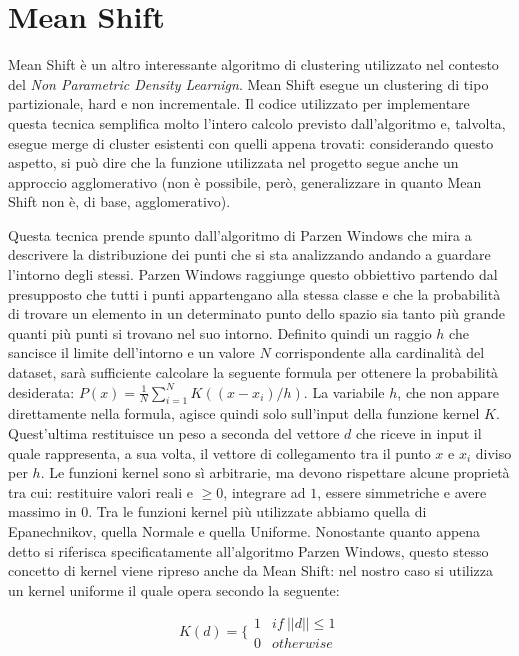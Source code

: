 \documentclass[]{report}
\begin{document}
	  	
\section*{Mean Shift}

	Mean Shift è un altro interessante algoritmo di clustering utilizzato nel contesto del {\it Non Parametric Density Learnign}. Mean Shift esegue un clustering di tipo partizionale, hard e non incrementale. Il codice utilizzato per implementare questa tecnica semplifica molto l'intero calcolo previsto dall'algoritmo e, talvolta, esegue merge di cluster esistenti con quelli appena trovati: considerando questo aspetto, si può dire che la funzione utilizzata nel progetto segue anche un approccio agglomerativo (non è possibile, però, generalizzare in quanto Mean Shift non è, di base, agglomerativo). 
	
	Questa tecnica prende spunto dall'algoritmo di Parzen Windows che mira a descrivere la distribuzione dei punti che si sta analizzando andando a guardare l'intorno degli stessi. Parzen Windows raggiunge questo obbiettivo partendo dal presupposto che tutti i punti appartengano alla stessa classe e che la probabilità di trovare un elemento in un determinato punto dello spazio sia tanto più grande quanti più punti si trovano nel suo intorno. Definito quindi un raggio $h$ che sancisce il limite dell'intorno e un valore $N$ corrispondente alla cardinalità del dataset, sarà sufficiente calcolare la seguente formula per ottenere la probabilità desiderata: $ P(x) = \frac{1}{N}\sum_{i=1}^{N}K((x-x_i)/h)$.  La variabile $h$, che non appare direttamente nella formula, agisce quindi solo sull'input della funzione kernel $K$. Quest'ultima restituisce un peso a seconda del vettore $d$ che riceve in input il quale rappresenta, a sua volta, il vettore di collegamento tra il punto $x$ e $x_i$ diviso per $h$. Le funzioni kernel sono sì arbitrarie, ma devono rispettare alcune proprietà tra cui: restituire valori reali e $\geq 0$, integrare ad $1$, essere simmetriche e avere massimo in $0$. Tra le funzioni kernel più utilizzate abbiamo quella di Epanechnikov, quella Normale e quella Uniforme. Nonostante quanto appena detto si riferisca specificatamente all'algoritmo Parzen Windows, questo stesso concetto di kernel viene ripreso anche da Mean Shift: nel nostro caso si utilizza un kernel uniforme il quale opera secondo la seguente:
	
	$$ K(d) = \bigg\lbrace \begin{matrix}
		1 & if~||d||\leq1 \\
		0 & otherwise
	\end{matrix}$$        
	
\end{document}
